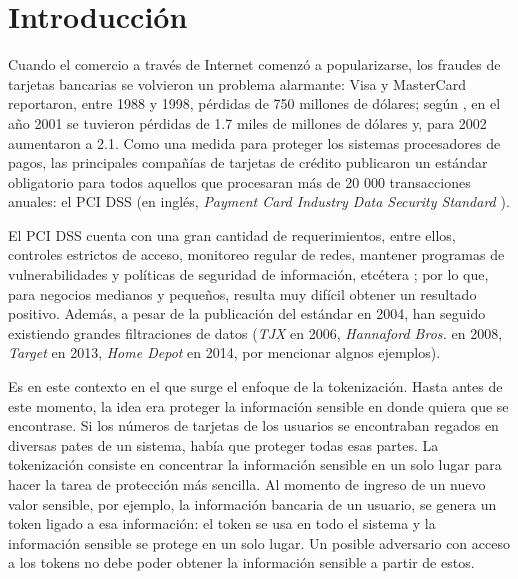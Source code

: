 %
%

\section{Introducción}


Cuando el comercio a través de Internet comenzó a popularizarse, los fraudes de
tarjetas bancarias se volvieron un problema alarmante: Visa y MasterCard
reportaron, entre 1988 y 1998, pérdidas de 750 millones de dólares; según
\cite{wallethub}, en el año 2001 se tuvieron pérdidas de 1.7 miles de millones
de dólares y, para 2002 aumentaron a 2.1. Como una medida para proteger los
sistemas procesadores de pagos, las principales compañías de tarjetas de crédito
publicaron un estándar obligatorio para todos aquellos que procesaran más de 20
000 transacciones anuales: el PCI DSS (en inglés, \textit{Payment Card Industry
Data Security Standard} \cite{pci_dss}).

El PCI DSS cuenta con una gran cantidad de requerimientos, entre ellos,
controles estrictos de acceso, monitoreo regular de redes, mantener programas de
vulnerabilidades y políticas de seguridad de información, etcétera
\cite{uk_association} \cite{search_security}; por lo que, para negocios
medianos y pequeños, resulta muy difícil obtener un resultado positivo. Además,
a pesar de la publicación del estándar en 2004, han seguido existiendo grandes
filtraciones de datos (\textit{TJX} en 2006, \textit{Hannaford Bros.} en 2008,
\textit{Target} en 2013, \textit{Home Depot} en 2014, por mencionar algnos
ejemplos).


Es en este contexto en el que surge el enfoque de la tokenización. Hasta antes
de este momento, la idea era proteger la información sensible en donde quiera
que se encontrase. Si los números de tarjetas de los usuarios se encontraban
regados en diversas pates de un sistema, había que proteger todas esas partes.
La tokenización consiste en concentrar la información sensible en un solo lugar
para hacer la tarea de protección más sencilla. Al momento de ingreso de un
nuevo valor sensible, por ejemplo, la información bancaria de un usuario, se
genera un token ligado a esa información: el token se usa en todo el sistema y
la información sensible se protege en un solo lugar. Un posible adversario con
acceso a los tokens no debe poder obtener la información sensible a partir de
estos.

